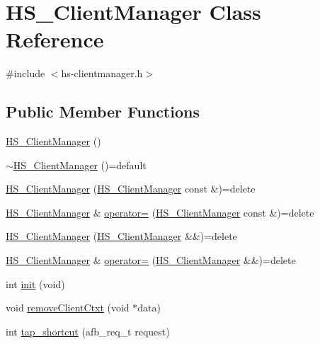 \hypertarget{class_h_s___client_manager}{}\section{H\+S\+\_\+\+Client\+Manager Class Reference}
\label{class_h_s___client_manager}


{\ttfamily \#include $<$hs-\/clientmanager.\+h$>$}

\subsection*{Public Member Functions}
\begin{DoxyCompactItemize}
\item 
\hyperlink{class_h_s___client_manager_adac35e476e559cc89bc39363525268bf}{H\+S\+\_\+\+Client\+Manager} ()
\item 
\hyperlink{class_h_s___client_manager_a50733274a93293fef892fdd453d74cae}{$\sim$\+H\+S\+\_\+\+Client\+Manager} ()=default
\item 
\hyperlink{class_h_s___client_manager_a0033db6b552f9de818789e76735c1ebc}{H\+S\+\_\+\+Client\+Manager} (\hyperlink{class_h_s___client_manager}{H\+S\+\_\+\+Client\+Manager} const \&)=delete
\item 
\hyperlink{class_h_s___client_manager}{H\+S\+\_\+\+Client\+Manager} \& \hyperlink{class_h_s___client_manager_ac8e02cffc79d4530b06e1143abb18891}{operator=} (\hyperlink{class_h_s___client_manager}{H\+S\+\_\+\+Client\+Manager} const \&)=delete
\item 
\hyperlink{class_h_s___client_manager_a715811c549cccd93cb1f903d179c8b41}{H\+S\+\_\+\+Client\+Manager} (\hyperlink{class_h_s___client_manager}{H\+S\+\_\+\+Client\+Manager} \&\&)=delete
\item 
\hyperlink{class_h_s___client_manager}{H\+S\+\_\+\+Client\+Manager} \& \hyperlink{class_h_s___client_manager_a49e225bb8421c812ac016309d54a00fa}{operator=} (\hyperlink{class_h_s___client_manager}{H\+S\+\_\+\+Client\+Manager} \&\&)=delete
\item 
int \hyperlink{class_h_s___client_manager_ae0b9b18adeffca7822b060ad4ea8a7a1}{init} (void)
\item 
void \hyperlink{class_h_s___client_manager_adc23f8b3f5cc06eeab39fb24098af3e2}{remove\+Client\+Ctxt} (void $\ast$data)
\item 
int \hyperlink{class_h_s___client_manager_a9910fc27c412530b5b9854b00bd16c07}{tap\+\_\+shortcut} (afb\+\_\+req\+\_\+t request)
\item 

\end{DoxyCompactItemize}
